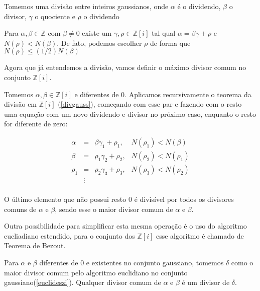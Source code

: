 Tomemos uma divis\~ao entre inteiros gaussianos, onde $\alpha$ \'e o dividendo, $\beta$ o divisor, $\gamma$ o quociente e $\rho$ o dividendo

\begin{Th}  \label{divgauss}

Para $ \alpha, \beta \in \mathbb{Z} $ com $\beta \neq 0$ existe um $\gamma, \rho \in \mathbb{Z}[i]$ tal qual $\alpha = \beta \gamma + \rho$ e $N(\rho) < N(\beta)$. De fato, podemos escolher $\rho$  de forma que $N(\rho) \leq (1/2)N(\beta)$

\end{Th}

Agora que j\'a entendemos a divis\~ao, vamos definir o m\'aximo divisor comum no conjunto $\mathbb{Z}[i]$.

\begin{Th}
\label{euclideszi}

Tomemos $\alpha , \beta \in \mathbb{Z}[i]$ e diferentes de $0$. Aplicamos recursivamente o teorema da divis\~ao em $\mathbb{Z}[i]$ (\ref{divgauss}), come\c{c}ando com esse par e fazendo com o resto uma  equa\c{c}\~ao com um novo dividendo e divisor no pr\'oximo caso, enquanto o resto for diferente de zero:

\[
\begin{array}{lcll}
\alpha & = & \beta \gamma_1 + \rho_1,  & N(\rho_1) < N(\beta)  \\
\beta  & = & \rho_1 \gamma_2 + \rho_2, & N(\rho_2) < N(\rho_1) \\
\rho_1 & = & \rho_2 \gamma_3 + \rho_3, & N(\rho_3) < N(\rho_2) \\
& \vdots &  &\\
\end{array}
\]

O \'ultimo elemento que n\~ao possui resto $0$ \'e divis\'ivel por todos os divisores comuns de $\alpha$ e $\beta$, sendo esse o maior divisor comum de $\alpha$ e $\beta$.

\end{Th}

Outra possibilidade para simplificar esta mesma opera\c{c}\~ao \'e o uso do algoritmo eucliadiano estendido, para o conjunto dos $\mathbb{Z}[i]$ esse algoritmo \'e chamado de Teorema de Bezout.

\begin{Cor} \label{cor}
	Para $\alpha$ e $\beta$ diferentes de $0$ e existentes no conjunto gaussiano, tomemos $\delta$ como o maior divisor comum pelo algoritmo euclidiano no conjunto gaussiano(\ref{euclideszi}). Qualquer divisor comum de $\alpha$ e $\beta$ \'e um divisor de $\delta$.
\end{Cor}

